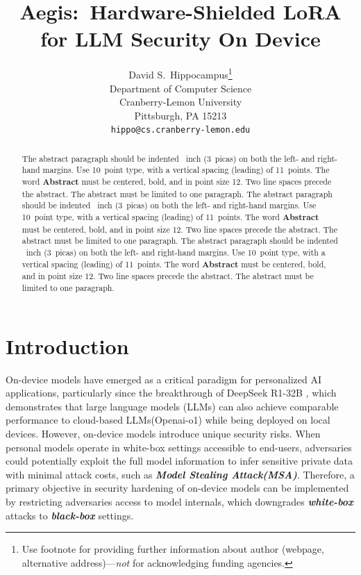 \documentclass{article}
\title{Aegis:~Hardware-Shielded LoRA for LLM Security On Device}
\author{%
  David S.~Hippocampus\thanks{Use footnote for providing further information
    about author (webpage, alternative address)---\emph{not} for acknowledging
    funding agencies.} \\
  Department of Computer Science\\
  Cranberry-Lemon University\\
  Pittsburgh, PA 15213 \\
  \texttt{hippo@cs.cranberry-lemon.edu} \\
}
\begin{document}
\maketitle


\begin{abstract}
  The abstract paragraph should be indented ~inch (3~picas) on
  both the left- and right-hand margins. Use 10~point type, with a vertical
  spacing (leading) of 11~points.  The word \textbf{Abstract} must be centered,
  bold, and in point size 12. Two line spaces precede the abstract. The abstract
  must be limited to one paragraph.
  The abstract paragraph should be indented ~inch (3~picas) on
  both the left- and right-hand margins. Use 10~point type, with a vertical
  spacing (leading) of 11~points.  The word \textbf{Abstract} must be centered,
  bold, and in point size 12. Two line spaces precede the abstract. The abstract
  must be limited to one paragraph.
  The abstract paragraph should be indented ~inch (3~picas) on
  both the left- and right-hand margins. Use 10~point type, with a vertical
  spacing (leading) of 11~points.  The word \textbf{Abstract} must be centered,
  bold, and in point size 12. Two line spaces precede the abstract. The abstract
  must be limited to one paragraph.
\end{abstract}


\section{Introduction}
On-device models\cite{chen2019deep_edge_computing} have emerged as a critical paradigm for personalized AI applications, particularly since the breakthrough of DeepSeek R1-32B \cite{guo2025deepseek}, which demonstrates that large language models (LLMs) can also achieve comparable performance to cloud-based LLMs(Openai-o1\cite{roumeliotis2023chatgpt}) while being deployed on local devices. 
However, on-device models introduce unique security risks. When personal models operate in white-box settings accessible to end-users, adversaries could potentially exploit the full model information to infer sensitive private data with minimal attack costs, such as \textbf{\textit{Model Stealing Attack(MSA)}}\cite{oliynyk2023stealing}. Therefore, a primary objective in security hardening of on-device models can be implemented by restricting adversaries access to model internals, which downgrades \textbf{\textit{white-box}} attacks to \textbf{\textit{black-box}} settings.
\end{document}
